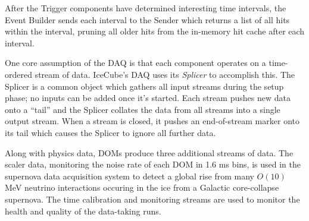 After the Trigger components have determined interesting time intervals, the
Event Builder sends each interval to the Sender which returns a list
of all hits within the interval, pruning all older
hits from the in-memory hit cache after each interval.


One core assumption of the DAQ is that each component operates on a
time-ordered stream of data.  IceCube's DAQ uses its \emph{Splicer} to
accomplish this.  The Splicer is a common object which gathers all input
streams during the setup phase; no inputs can be added once it's started.  Each
stream pushes new data onto a ``tail'' and the Splicer collates
the data from all streams into a single output stream.  When a
stream is closed, it pushes an end-of-stream marker onto its tail which causes
the Splicer to ignore all further data.




Along with physics data, DOMs produce three additional streams of data.
The scaler data, monitoring the noise rate of each DOM in 1.6 ms bins,
is used in the supernova data acquisition system \cite{IC3:supernova} to detect a
global rise from many $O(10)$ MeV neutrino interactions occuring in the ice
from a Galactic core-collapse supernova.  The time calibration and monitoring
streams are used to monitor the health and quality of the data-taking runs.

